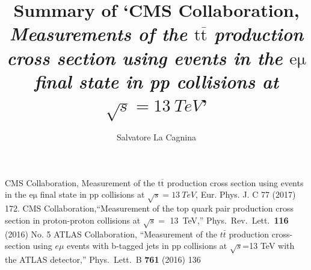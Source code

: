 \documentclass[11pt, twocolumn, a4paper]{article}
\begin{document}
\thispagestyle{empty}

\author{Salvatore La Cagnina}

\title{Summary of `CMS Collaboration, {\it Measurements of the $\mathrm{t\overline{t}}$ production cross section using events in the $\mathrm{e\mu}$ final state in pp collisions at $\sqrt{s} = \SI{13}{TeV}$}'}

\maketitle


\begin{thebibliography}{99}
 CMS Collaboration, Measurement of the $\mathrm{t\overline{t}}$ production cross section using events in the e$\mathrm{\mu}$ final state in pp collisions at ${\sqrt{s} = \SI{13}{TeV}}$, Eur. Phys. J. C 77 (2017) 172.
  CMS Collaboration,``Measurement of the top quark pair production cross section in proton-proton collisions at $\sqrt{s} =$ \SI{13}{TeV},''
  Phys.\ Rev.\ Lett.\  {\bf 116} (2016) No. 5
  ATLAS Collaboration,
  ``Measurement of the $t\bar{t}$ production cross-section using $e\mu$ events with b-tagged jets in pp collisions at $\sqrt{s}$=13 TeV with the ATLAS detector,''
  Phys.\ Lett.\ B {\bf 761} (2016) 136
\end{thebibliography}
\end{document}
